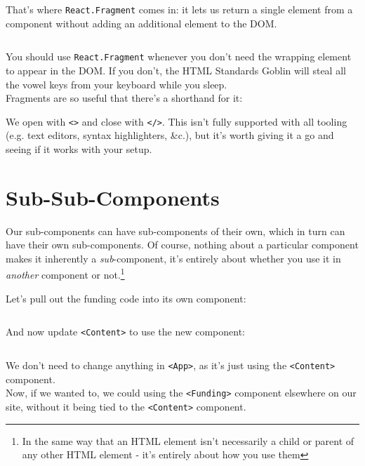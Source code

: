 That's where \texttt{React.Fragment} comes in: it lets us return a single element from a component without adding an additional element to the DOM.

\inputminted{jsx}{01/figures/02/09-React.Fragment.jsx}

You should use \texttt{React.Fragment} whenever you don't need the wrapping element to appear in the DOM. If you don't, the HTML Standards Goblin will steal all the vowel keys from your keyboard while you sleep.
\\

Fragments are so useful that there's a shorthand for it:


We open with \texttt{<>} and close with \texttt{</>}. This isn't fully supported with all tooling (e.g. text editors, syntax highlighters, \&c.), but it's worth giving it a go and seeing if it works with your setup.



\section{Sub-Sub-Components}

Our sub-components can have sub-components of their own, which in turn can have their own sub-components. Of course, nothing about a particular component makes it inherently a \textit{sub}-component, it's entirely about whether you use it in \textit{another} component or not.\footnote{In the same way that an HTML element isn't necessarily a child or parent of any other HTML element - it's entirely about how you use them}


\pagebreak


Let's pull out the funding code into its own component:

\inputminted{jsx}{01/figures/02/11-Funding.jsx}

And now update \texttt{<Content>} to use the new component:

\inputminted{jsx}{01/figures/02/12-Content-with-Funding.jsx}

We don't need to change anything in \texttt{<App>}, as it's just using the \texttt{<Content>} component.
\\

Now, if we wanted to, we could using the \texttt{<Funding>} component elsewhere on our site, without it being tied to the \texttt{<Content>} component.


